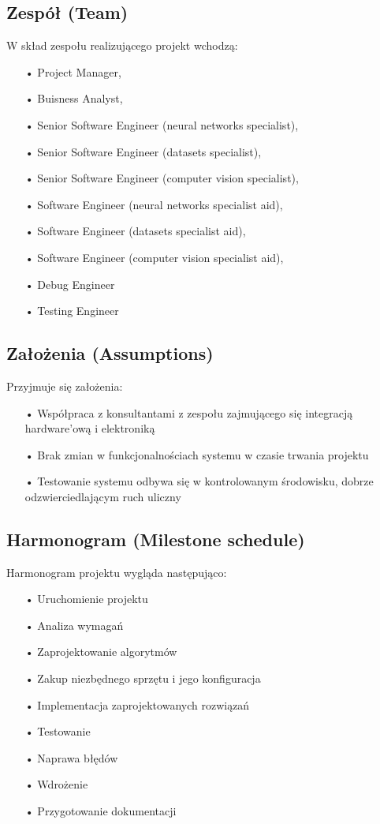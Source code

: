 \subsection{Zespół (Team)}
W skład zespołu realizującego projekt wchodzą:
\begin{itemize}
\item[•] Project Manager,
\item[•] Buisness Analyst,
\item[•] Senior Software Engineer (neural networks specialist),
\item[•] Senior Software Engineer (datasets specialist),
\item[•] Senior Software Engineer (computer vision specialist),
\item[•] Software Engineer (neural networks specialist aid),
\item[•] Software Engineer (datasets specialist aid),
\item[•] Software Engineer (computer vision specialist aid),
\item[•] Debug Engineer
\item[•] Testing Engineer
\end{itemize}
\subsection{Założenia (Assumptions)}
Przyjmuje się założenia:
\begin{itemize}
\item[•] Współpraca z konsultantami z zespołu zajmującego się integracją hardware'ową i elektroniką
\item[•] Brak zmian w funkcjonalnościach systemu w czasie trwania projektu
\item[•] Testowanie systemu odbywa się w kontrolowanym środowisku, dobrze odzwierciedlającym ruch uliczny
\end{itemize}
\subsection{Harmonogram (Milestone schedule)}
Harmonogram projektu wygląda następująco:
\begin{itemize}
\item[•] Uruchomienie projektu
\item[•] Analiza wymagań
\item[•] Zaprojektowanie algorytmów
\item[•] Zakup niezbędnego sprzętu i jego konfiguracja
\item[•] Implementacja zaprojektowanych rozwiązań
\item[•] Testowanie
\item[•] Naprawa błędów
\item[•] Wdrożenie
\item[•] Przygotowanie dokumentacji
\end{itemize}
